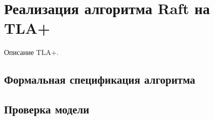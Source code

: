 \section{Реализация алгоритма Raft на TLA+}

Описание TLA+.

\subsection{Формальная спецификация алгоритма}
\subsection{Проверка модели}
